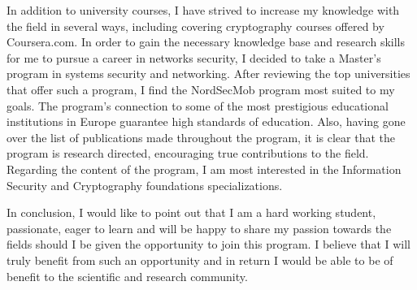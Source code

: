 \documentclass[10pt,stdletter,dateno,sigleft]{newlfm} %
\begin{document}
\begin{newlfm}
In addition to university courses, I have strived to increase my knowledge with the field in several ways, including covering cryptography courses offered by Coursera.com. In order to gain the necessary knowledge base and research skills for me to pursue a career in networks security, I decided to take a Master's program in systems security and networking. After reviewing the top universities that offer such a program, I find the NordSecMob program most suited to my goals. The program's connection to some of the most prestigious educational institutions in Europe guarantee high standards of education. Also, having gone over the list of publications made throughout the program, it is clear that the program is research directed, encouraging true contributions to the field. Regarding the content of the program, I am most interested in the Information Security and Cryptography foundations specializations.

In conclusion, I would like to point out that I am a hard working student, passionate, eager to learn and will be happy to share my passion towards the fields should I be given the  opportunity to join this program. I believe that I will truly benefit from such an opportunity and in return I would be able to be of benefit to the scientific and research community.

\end{newlfm}
\end{document}
